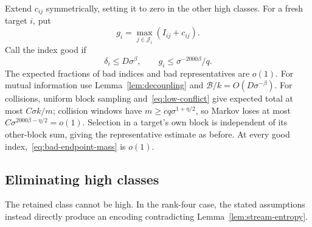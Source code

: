 Extend $c_{ij}$ symmetrically, setting it to zero in the other high
classes.  For a fresh target $i$, put
\[
 g_i=\max_{j\in\mathcal J_i}(I_{ij}+c_{ij}).
\]
Call the index good if
\begin{equation}\label{eq:good-index}
 \delta_i\le D\sigma^\beta,\qquad
 g_i\le\sigma^{-2000\beta}/q.
\end{equation}
The expected fractions of bad indices and bad representatives are
$o(1)$.  For mutual information use Lemma~\ref{lem:decoupling} and
$\mathcal B/k=O(D\sigma^{-\beta})$.  For collisions, uniform block
sampling and~\eqref{eq:low-conflict} give expected total at most
$C\sigma k/m$; collision windows have
$m\ge cq\sigma^{1+\eta/2}$, so Markov loses at most
$C\sigma^{2000\beta-\eta/2}=o(1)$.  Selection in a target's own block
is independent of its other-block sum, giving the representative estimate
as before.  At every good index,~\eqref{eq:bad-endpoint-mass} is $o(1)$.

\subsection{Eliminating high classes}

\begin{lemma}\label{lem:high-ranks}
The retained class cannot be high.  In the rank-four case, the stated
assumptions instead directly produce an encoding contradicting
Lemma~\ref{lem:stream-entropy}.
\end{lemma}

